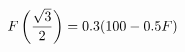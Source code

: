 \documentclass[preview]{standalone}
\begin{document}
\begin{align*}
\special{dvisvgm:raw <g id='unique000'>}F \left(\frac{\sqrt{3}}{2}\right) = 0.3(100 - 0.5F)\special{dvisvgm:raw </g>}
\end{align*}
\end{document}

